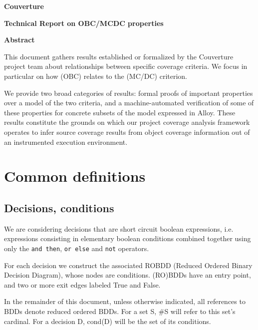 \documentclass[a4paper,12pt,twoside]{article}
\newcommand{\couv}{{\sc Couverture}}
\newcommand{\andthen}{\texttt{and then}}
\newcommand{\orelse}{\texttt{or else}}
\newcommand{\adanot}{\texttt{not}}
\begin{document}
\pagestyle{empty}

\vfill

\begin{center}%
{\Large \textbf{\couv{}}}

{\Large \textbf{Technical Report on OBC/MCDC properties}}

\vfill

{\large \textbf{Abstract}}
\end{center}

This document gathers results established or formalized by the \couv{}
project team about relationships between specific coverage criteria.
%
We focus in particular on how  (OBC) relates to the
 (MC/DC) criterion.

We provide two broad categories of results: formal proofs of important
properties over a model of the two criteria, and a machine-automated
verification of some of these properties for concrete subsets of the model
expressed in Alloy.
%
These results constitute the grounds on which our project coverage analysis
framework operates to infer source coverage results from object coverage
information out of an instrumented execution environment.

\vfill

\newpage
\pagestyle{plain}


\section{Common definitions}

\subsection{Decisions, conditions}

We are considering decisions that are short circuit boolean expressions,
i.e. expressions consisting in elementary boolean conditions combined
together using only the \andthen{}, \orelse{} and \adanot{} operators.

For each decision we construct the associated ROBDD (Reduced Ordered
Binary Decision Diagram), whose nodes are conditions. (RO)BDDs have an
entry point, and two or more exit edges labeled True and False.

In the remainder of this document, unless otherwise indicated, all
references to BDDs denote reduced ordered BDDs. For a set S, \#S will
refer to this set's cardinal. For a decision D, cond(D) will be the
set of its conditions.
\end{document}
